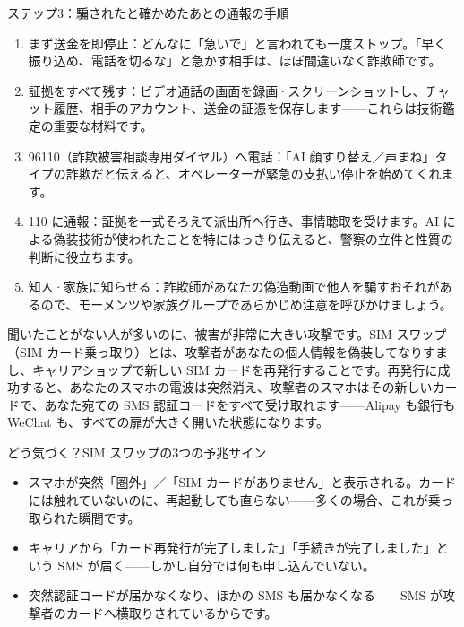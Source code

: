 \begin{tcbwarn}{ステップ3：騙されたと確かめたあとの通報の手順}
\begin{enumerate}
  \item まず送金を即停止：どんなに「急いで」と言われても一度ストップ。「早く振り込め、電話を切るな」と急かす相手は、ほぼ間違いなく詐欺師です。
  \item 証拠をすべて残す：ビデオ通話の画面を録画·スクリーンショットし、チャット履歴、相手のアカウント、送金の証憑を保存します——これらは技術鑑定の重要な材料です。
  \item 96110（詐欺被害相談専用ダイヤル）へ電話：「AI 顔すり替え／声まね」タイプの詐欺だと伝えると、オペレーターが緊急の支払い停止を始めてくれます。
  \item 110 に通報：証拠を一式そろえて派出所へ行き、事情聴取を受けます。AI による偽装技術が使われたことを特にはっきり伝えると、警察の立件と性質の判断に役立ちます。
  \item 知人·家族に知らせる：詐欺師があなたの偽造動画で他人を騙すおそれがあるので、モーメンツや家族グループであらかじめ注意を呼びかけましょう。
\end{enumerate}

\end{tcbwarn}


聞いたことがない人が多いのに、被害が非常に大きい攻撃です。SIM スワップ（SIM カード乗っ取り）とは、攻撃者があなたの個人情報を偽装してなりすまし、キャリアショップで新しい SIM カードを再発行することです。再発行に成功すると、あなたのスマホの電波は突然消え、攻撃者のスマホはその新しいカードで、あなた宛ての SMS 認証コードをすべて受け取れます——Alipay も銀行も WeChat も、すべての扉が大きく開いた状態になります。

\begin{tcbinfo}{どう気づく？SIM スワップの3つの予兆サイン}
\begin{itemize}
  \item スマホが突然「圏外」／「SIM カードがありません」と表示される。カードには触れていないのに、再起動しても直らない——多くの場合、これが乗っ取られた瞬間です。
  \item キャリアから「カード再発行が完了しました」「手続きが完了しました」という SMS が届く——しかし自分では何も申し込んでいない。
  \item 突然認証コードが届かなくなり、ほかの SMS も届かなくなる——SMS が攻撃者のカードへ横取りされているからです。
\end{itemize}

\end{tcbinfo}

